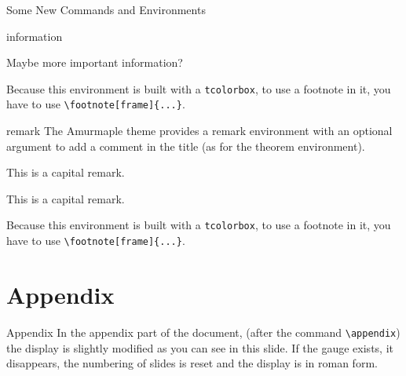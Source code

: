\documentclass[10pt,aspectratio=169,english]{beamer}
\begin{document}
\begin{frame}{Some New Commands and Environments}
\begin{docEnvironment}{information}{}
\begin{information}
  Maybe more important information?
\end{information}
Because this environment is built with a \texttt{tcolorbox}, to use a footnote in it, you have to use \lstinline+\footnote[frame]{...}+.
\end{docEnvironment}

\begin{docEnvironment}{remark}{}
The Amurmaple theme provides a remark environment with an optional
  argument to add a comment in the title (as for the theorem environment).
  \begin{Code}
\begin{remark}
  This is a capital remark.
\end{remark}
\end{Code}
\begin{remark}
  This is a capital remark.
\end{remark}

Because this environment is built with a \texttt{tcolorbox}, to use a footnote in it, you have to use \lstinline+\footnote[frame]{...}+.
\end{docEnvironment}

\end{frame}

\appendix

\section{Appendix}

\sepframe

\begin{frame}[fragile]{Appendix}
  In the appendix part of the document, (after the command
  \lstinline+\appendix+) the display is slightly modified as you
  can see in this slide. If the gauge exists, it disappears, the numbering
  of slides is reset and the display is in roman form.
\end{frame}


\end{document}
